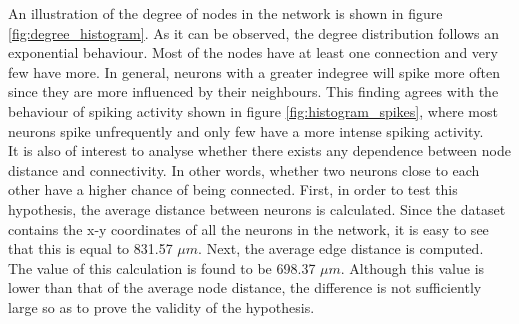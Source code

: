 An illustration of the degree of nodes in the network is shown in figure \ref{fig:degree_histogram}. As it can be observed, the degree distribution follows an exponential behaviour. Most of the nodes have at least one connection and very few have more. In general, neurons with a greater indegree will spike more often since they are more influenced by their neighbours. This finding agrees with the behaviour of spiking activity shown in figure \ref{fig:histogram_spikes}, where most neurons spike unfrequently and only few have a more intense spiking activity.\\

It is also of interest to analyse whether there exists any dependence between node distance and connectivity. In other words, whether two neurons close to each other have a higher chance of being connected. First, in order to test this hypothesis, the average distance between neurons is calculated. Since the dataset contains the x-y coordinates of all the neurons in the network, it is easy to see that this is equal to 831.57 \(\mu m\). Next, the average edge distance is computed. The value of this calculation is found to be 698.37 \(\mu m\). Although this value is lower than that of the average node distance, the difference is not sufficiently large so as to prove the validity of the hypothesis.








